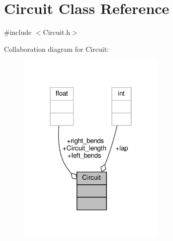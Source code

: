 \hypertarget{class_circuit}{}\section{Circuit Class Reference}
\label{class_circuit}


{\ttfamily \#include $<$Circuit.\+h$>$}



Collaboration diagram for Circuit\+:
\nopagebreak
\begin{figure}[H]
\begin{center}
\leavevmode
\includegraphics[width=202pt]{class_circuit__coll__graph}
\end{center}
\end{figure}
